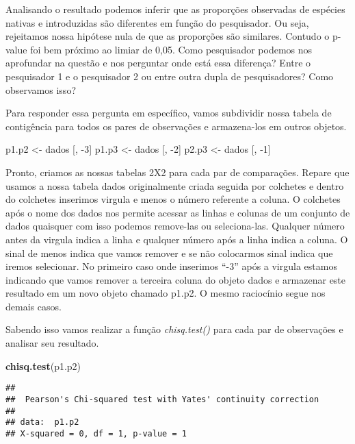 \documentclass[titlepage, oneside, openany, a4paper]{book}
\newenvironment{Shaded}{\begin{snugshade}}{\end{snugshade}}
\newcommand{\DecValTok}[1]{\textcolor[rgb]{0.00,0.00,0.81}{#1}}
\newcommand{\KeywordTok}[1]{\textcolor[rgb]{0.13,0.29,0.53}{\textbf{#1}}}
\newcommand{\NormalTok}[1]{#1}
\newcommand{\StringTok}[1]{\textcolor[rgb]{0.31,0.60,0.02}{#1}}
\begin{document}
Analisando o resultado podemos inferir que as proporções observadas de espécies nativas e introduzidas são diferentes em função do pesquisador. Ou seja, rejeitamos nossa hipótese nula de que as proporções são similares. Contudo o p-value foi bem próximo ao limiar de 0,05. Como pesquisador podemos nos aprofundar na questão e nos perguntar onde está essa diferença? Entre o pesquisador 1 e o pesquisador 2 ou entre outra dupla de pesquisadores? Como observamos isso?

Para responder essa pergunta em específico, vamos subdividir nossa tabela de contigência para todos os pares de observações e armazena-los em outros objetos.

\begin{Shaded}
\begin{Highlighting}[]
\NormalTok{p1.p2 <-}\StringTok{ }\NormalTok{dados [, }\DecValTok{-3}\NormalTok{]}
\NormalTok{p1.p3 <-}\StringTok{ }\NormalTok{dados [, }\DecValTok{-2}\NormalTok{]}
\NormalTok{p2.p3 <-}\StringTok{ }\NormalTok{dados [, }\DecValTok{-1}\NormalTok{]}
\end{Highlighting}
\end{Shaded}

Pronto, criamos as nossas tabelas 2X2 para cada par de comparações. Repare que usamos a nossa tabela dados originalmente criada seguida por colchetes e dentro do colchetes inserimos virgula e menos o número referente a coluna. O colchetes após o nome dos dados nos permite acessar as linhas e colunas de um conjunto de dados quaisquer com isso podemos remove-las ou seleciona-las. Qualquer número antes da virgula indica a linha e qualquer número após a linha indica a coluna. O sinal de menos indica que vamos remover e se não colocarmos sinal indica que iremos selecionar. No primeiro caso onde inserimos ``-3'' após a virgula estamos indicando que vamos remover a terceira coluna do objeto dados e armazenar este resultado em um novo objeto chamado p1.p2. O mesmo raciocínio segue nos demais casos.

Sabendo isso vamos realizar a função \emph{chisq.test()} para cada par de observações e analisar seu resultado.

\begin{Shaded}
\begin{Highlighting}[]
\KeywordTok{chisq.test}\NormalTok{(p1.p2)}
\end{Highlighting}
\end{Shaded}

\begin{verbatim}
## 
##  Pearson's Chi-squared test with Yates' continuity correction
## 
## data:  p1.p2
## X-squared = 0, df = 1, p-value = 1
\end{verbatim}
\end{document}
